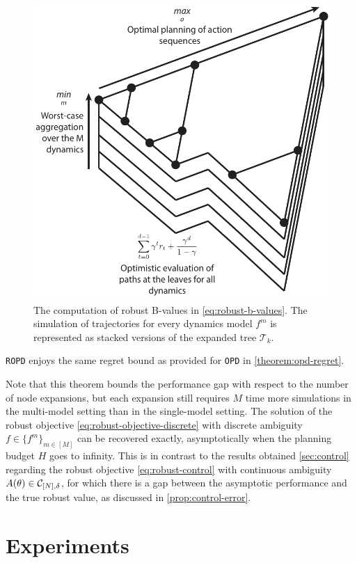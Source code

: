 \documentclass{article}
\begin{document}
\begin{figure}
\centering
\includegraphics[width=0.4\linewidth]{img/robust-control-tree}
\caption{The computation of robust B-values in \eqref{eq:robust-b-values}. The simulation of trajectories for every dynamics model $f^m$ is represented as stacked versions of the expanded tree $\mathcal{T}_k$.}
\label{fig:drop}
\end{figure}

\begin{theorem}
\label{theorem:drop-regret}
\texttt{ROPD} enjoys the same regret bound as provided for \texttt{OPD} in \autoref{theorem:opd-regret}.
\end{theorem}

Note that this theorem bounds the performance gap with respect to the number of node expansions, but each expansion still requires $M$ time more simulations in the multi-model setting than in the single-model setting. The solution of the robust objective \eqref{eq:robust-objective-discrete} with discrete ambiguity $f\in\{f^m\}_{m\in[M]}$ can be recovered exactly, asymptotically when the planning budget $H$ goes to infinity. This is in contrast to the results obtained \autoref{sec:control} regarding the robust objective \eqref{eq:robust-control} with continuous ambiguity $A(\theta)\in\mathcal{C}_{[N],\delta}$, for which there is a gap between the asymptotic performance and the true robust value, as discussed in \autoref{prop:control-error}.

\section{Experiments}

\end{document}
